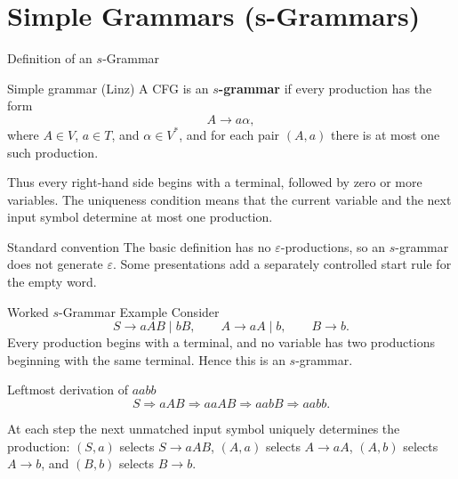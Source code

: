\documentclass[10pt]{beamer}
\begin{document}
\section{Simple Grammars (s-Grammars)}

\begin{frame}{Definition of an $s$-Grammar}
  \small
  \begin{block}{Simple grammar (Linz)}
    A CFG is an \textbf{$s$-grammar} if every production has the form
    \[
      A\to a\alpha,
    \]
    where $A\in V$, $a\in T$, and $\alpha\in V^*$, and for each pair
    $(A,a)$ there is at most one such production.
  \end{block}
  Thus every right-hand side begins with a terminal, followed by zero or more
  variables. The uniqueness condition means that the current variable and the
  next input symbol determine at most one production.
  \pause
  \begin{alertblock}{Standard convention}
    The basic definition has no $\varepsilon$-productions, so an
    $s$-grammar does not generate $\varepsilon$. Some presentations add a
    separately controlled start rule for the empty word.
  \end{alertblock}
\end{frame}

\begin{frame}{Worked $s$-Grammar Example}
  \small
  Consider
  \[
    S\to aAB\mid bB,\qquad
    A\to aA\mid b,\qquad
    B\to b.
  \]
  Every production begins with a terminal, and no variable has two
  productions beginning with the same terminal. Hence this is an $s$-grammar.
  \begin{exampleblock}{Leftmost derivation of $aabb$}
    \[
      S\Rightarrow aAB
       \Rightarrow aaAB
       \Rightarrow aabB
       \Rightarrow aabb.
    \]
  \end{exampleblock}
  At each step the next unmatched input symbol uniquely determines the
  production: $(S,a)$ selects $S\to aAB$, $(A,a)$ selects $A\to aA$,
  $(A,b)$ selects $A\to b$, and $(B,b)$ selects $B\to b$.
\end{frame}
\end{document}
